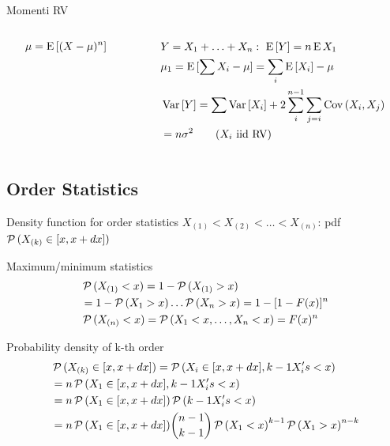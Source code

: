 \documentclass[asd-beamer.tex]{subfiles}
\begin{document}
\begin{frame}{Momenti RV}
\begin{columns}[T]\begin{column}{0.4\textwidth}
\begin{align*}
&\mu=\operatorname{E}{[(X-\mu)^n]}\\
&
\end{align*}
\end{column}\begin{column}{0.6\textwidth}

\begin{align*}
&Y=X_1+\ldots+X_n:\ \operatorname{E}{[Y]}=n\operatorname{E}{X_1}\\
&\mu_1=\operatorname{E}{[\sum X_i-\mu]}=\sum_i\operatorname{E}{[X_i]}-\mu\\
&\operatorname{Var}{[Y]}=\sum\operatorname{Var}{[X_i]}+2\sum_i^{n-1}\sum_{j=i}\operatorname{Cov}{(X_i,X_j)}\\
&=n\sigma^2\tag{$X_i$ iid RV}
\end{align*}
\end{column}\end{columns}
\end{frame}

\subsection{Order Statistics}

\begin{frame}{Density function for order statistics}
	$X_{(1)}<X_{(2)}<\ldots<X_{(n)}$: pdf $\operatorname{\mathcal{P}}{(X_{(k)}\in[x,x+dx])}$
	\begin{block}{Maximum/minimum statistics}
		\begin{align*}
		&\operatorname{\mathcal{P}}{(X_{(1)}<x)}=1-\operatorname{\mathcal{P}}{(X_{(1)}>x)}\\
		&=1-\operatorname{\mathcal{P}}{(X_1>x)}\ldots\operatorname{\mathcal{P}}{(X_n>x)}=1-[1-F(x)]^n\\
		&\operatorname{\mathcal{P}}{(X_{(n)}<x)}=\operatorname{\mathcal{P}}{(X_1<x,\ldots,X_n<x)}=F(x)^n
		\end{align*}
	\end{block}
	\begin{block}{Probability density of k-th order}
		\begin{align*}
		&\operatorname{\mathcal{P}}{(X_{(k)}\in[x,x+dx])}=\operatorname{\mathcal{P}}{(X_i\in[x,x+dx],k-1 X_i's<x)}\\
		&=n\operatorname{\mathcal{P}}{(X_1\in[x,x+dx],k-1 X_i's<x)}\\
		&=n\operatorname{\mathcal{P}}{(X_1\in[x,x+dx])}\operatorname{\mathcal{P}}{(k-1 X_i's<x)}\\
		&=n\operatorname{\mathcal{P}}{(X_1\in[x,x+dx])}\binom{n-1}{k-1}\operatorname{\mathcal{P}}{(X_1<x)}^{k-1}\operatorname{\mathcal{P}}{(X_1>x)}^{n-k}
		\end{align*}
	\end{block}
\end{frame}
\end{document}
